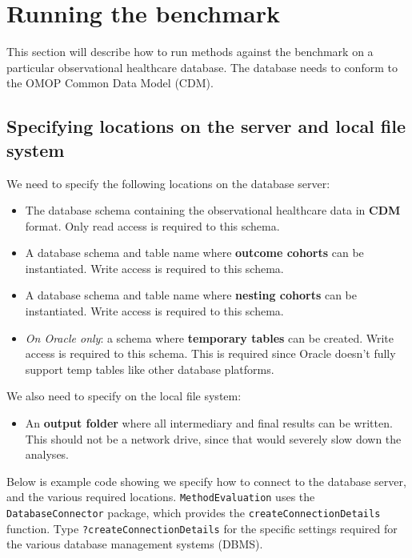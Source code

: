 \documentclass[]{article}
\providecommand{\tightlist}{%
  \setlength{\itemsep}{0pt}\setlength{\parskip}{0pt}}
\begin{document}
\hypertarget{running-the-benchmark}{%
\section{Running the benchmark}\label{running-the-benchmark}}

This section will describe how to run methods against the benchmark on a
particular observational healthcare database. The database needs to
conform to the OMOP Common Data Model (CDM).

\hypertarget{specifying-locations-on-the-server-and-local-file-system}{%
\subsection{Specifying locations on the server and local file
system}\label{specifying-locations-on-the-server-and-local-file-system}}

We need to specify the following locations on the database server:

\begin{itemize}
\tightlist
\item
  The database schema containing the observational healthcare data in
  \textbf{CDM} format. Only read access is required to this schema.
\item
  A database schema and table name where \textbf{outcome cohorts} can be
  instantiated. Write access is required to this schema.
\item
  A database schema and table name where \textbf{nesting cohorts} can be
  instantiated. Write access is required to this schema.
\item
  \emph{On Oracle only}: a schema where \textbf{temporary tables} can be
  created. Write access is required to this schema. This is required
  since Oracle doesn't fully support temp tables like other database
  platforms.
\end{itemize}

We also need to specify on the local file system:

\begin{itemize}
\tightlist
\item
  An \textbf{output folder} where all intermediary and final results can
  be written. This should not be a network drive, since that would
  severely slow down the analyses.
\end{itemize}

Below is example code showing we specify how to connect to the database
server, and the various required locations. \texttt{MethodEvaluation}
uses the \texttt{DatabaseConnector} package, which provides the
\texttt{createConnectionDetails} function. Type
\texttt{?createConnectionDetails} for the specific settings required for
the various database management systems (DBMS).
\end{document}
